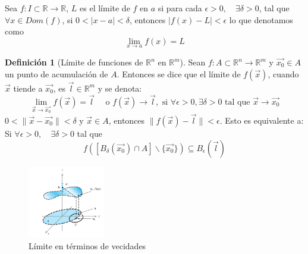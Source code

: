 \documentclass[letterpaper]{article}
\providecommand{\abs}[1]{\lvert#1\rvert}
\providecommand{\norm}[1]{\lVert#1\rVert}
\newcommand{\R}{\mathds{R}}
\renewcommand{\*}{\cdot}
\theoremstyle{definition}
\newtheorem{definition}{Definición}
\begin{document}
Sea $ f: I\subset  \R \to \R $, $ L $ es el límite de $ f $ en $ a $ si para cada $ \epsilon > 0, \quad \exists \delta > 0 $, tal que $ \forall x \in Dom(f) $, si $ 0 < \abs{x - a} < \delta $, entonces $ \abs{f(x) - L} < \epsilon $ lo que denotamos como
\[ \lim\limits_{x \to a}f(x) = L \]
\begin{definition}[Límite de funciones de $ \R^n $ en $ \R^m $]
	Sean $ f: A \subset \R^n \to  \R^m $ y $ \vec{x_0} \in A $ un punto de acumulación de $ A $. Entonces se dice que el límite de $ f(\vec{x}) $, cuando $ \vec{x} $ tiende a $ \vec{x_0} $, es $ \vec{l} \in \R^m $ y se denota:
	\[ \lim\limits_{\vec{x} \to \vec{x_0}}f(\vec{x}) = \vec{l} \quad \text{ o } f(\vec{x}) \to \vec{l}, \text{ si } \forall \epsilon > 0, \exists \delta > 0 \text{ tal que } \vec{x} \to \vec{x_0} \]
	$ 0 < \norm{\vec{x} - \vec{x_0}} < \delta $ y $ \vec{x} \in A $, entonces $ \norm{f(\vec{x}) - \vec{l}} < \epsilon $. Esto es equivalente a: Si $ \forall \epsilon > 0, \quad \exists \delta > 0  $ tal que \[ f([B_\delta(\vec{x_0})\cap A]\backslash\{ \vec{x_0} \}) \subseteq B_\epsilon(\vec{l}) \]
\end{definition}
\begin{figure}[h]
	\centering
	\includegraphics[width=0.3\textwidth]{img/limite}
	\caption{Límite en términos de vecidades}
\end{figure}
\end{document}
